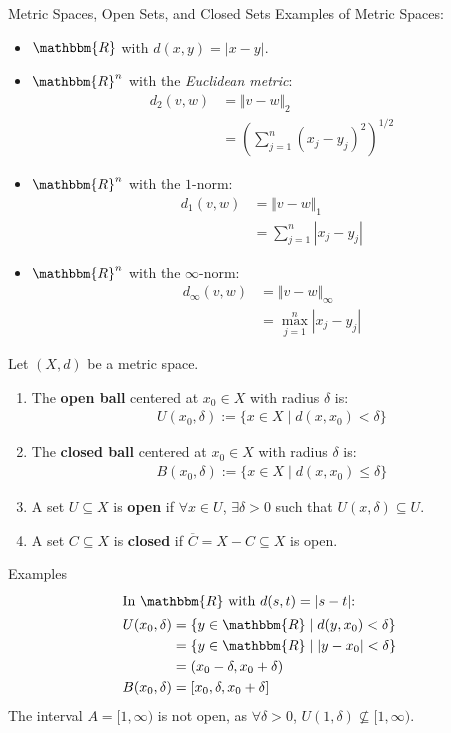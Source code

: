 \documentclass[10pt]{extarticle}
\newcommand{\R}{\mathbbm{R}}
\begin{document}
  \begin{problem}{Metric Spaces, Open Sets, and Closed Sets}
    Examples of Metric Spaces:
    \begin{itemize}
      \item $\R$ with $d(x,y) = |x-y|$.
      \item $\R^n$ with the \textsl{Euclidean metric}:
        \begin{align*}
          d_2(v,w) &= \Vert v - w \Vert_2\\
                   &= \left(\sum_{j=1}^{n}(x_j-y_j)^2\right)^{1/2}
        \end{align*}
      \item $\R^n$ with the $1$-norm:
        \begin{align*}
          d_1(v,w) &= \Vert v-w\Vert_1\\
                   &= \sum_{j=1}^{n} |x_j-y_j|
        \end{align*}
      \item $\R^n$ with the $\infty$-norm:
        \begin{align*}
          d_{\infty}(v,w) &= \Vert v-w\Vert_{\infty}\\
                          &= \max_{j=1}^{n} |x_j-y_j|
        \end{align*}
    \end{itemize}
    Let $(X,d)$ be a metric space.
    \begin{enumerate}[(1)]
      \item The \textbf{open ball} centered at $x_0\in X$ with radius $\delta$ is:
        \begin{align*}
        U(x_0,\delta) := \{x\in X \mid d(x,x_0) < \delta\}
        \end{align*}
      \item The \textbf{closed ball} centered at $x_0\in X$  with radius $\delta$ is:
        \begin{align*}
          B(x_0,\delta) := \{x\in X \mid d(x,x_0) \leq \delta\}
        \end{align*}
      \item A set $U\subseteq X$ is \textbf{open} if $\forall x\in U$, $\exists \delta > 0$ such that $U(x,\delta)\subseteq U$.
      \item A set $C\subseteq X$ is \textbf{closed} if $\overline{C} = X-C\subseteq X$ is open.
    \end{enumerate}
    \begin{problem}{Examples}
      \begin{align*}
        \shortintertext{In $\R$ with $d(s,t) = |s-t|$:}
        U(x_0,\delta) &= \{y\in\R \mid d(y,x_0) < \delta\}\\
                      &= \{y\in\R \mid |y-x_0| < \delta\}\\
                      &= (x_0-\delta,x_0+\delta)\\
        B(x_0,\delta) &= [x_0,\delta,x_0+\delta]
      \end{align*}
      The interval $A = [1,\infty)$ is not open, as $\forall \delta > 0$, $U(1,\delta)\not\subseteq [1,\infty)$.\\


\end{problem}
\end{problem}
\end{document}
